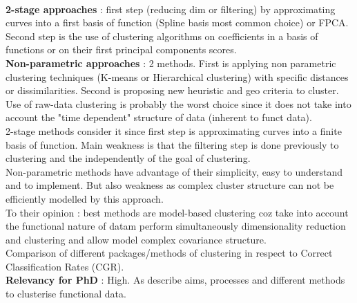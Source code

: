 \documentclass[]{report}
\begin{document}
\begin{itemize}
	\\\textbf{2-stage approaches} : first step (reducing dim or filtering) by approximating curves into a first basis of function (Spline basis most common choice) or FPCA. Second step is the use of clustering algorithms on coefficients in a basis of functions or on their first principal components scores.
	\\\textbf{Non-parametric approaches} : 2 methods. First is applying non parametric clustering techniques (K-means or Hierarchical clustering) with specific distances or dissimilarities. Second is proposing new heuristic and geo criteria to cluster.
	\\ Use of raw-data clustering is probably the worst choice since it does not take into account the "time dependent" structure of data (inherent to funct data).
	\\2-stage methods consider it since first step is approximating curves into a finite basis of function. Main weakness is that the filtering step is done previously to clustering and the independently of the goal of clustering.
	\\ Non-parametric methods have advantage of their simplicity, easy to understand and to implement. But also weakness as complex cluster structure can not be efficiently modelled by this approach.
	\\ To their opinion : best methods are model-based clustering coz take into account the functional nature of datam perform simultaneously dimensionality reduction and clustering and allow model complex covariance structure.
	\\Comparison of different packages/methods of clustering in respect to Correct Classification Rates (CGR).
	\\\textbf{Relevancy for PhD} : High. As describe aims, processes and different methods to clusterise functional data.
	
\end{itemize}

	\newpage
	
	
	
\end{document}
